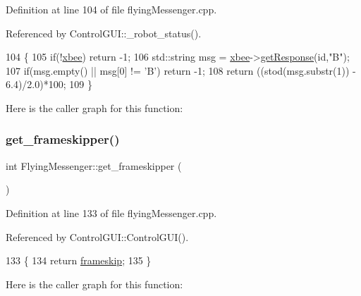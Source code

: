 Definition at line 104 of file flying\+Messenger.\+cpp.



Referenced by Control\+G\+U\+I\+::\+\_\+robot\+\_\+status().


\begin{DoxyCode}
104                                            \{
105     \textcolor{keywordflow}{if}(!\hyperlink{class_flying_messenger_a419820a45ea2bc496c10bf36b7b49033}{xbee}) \textcolor{keywordflow}{return} -1;
106     std::string msg = \hyperlink{class_flying_messenger_a419820a45ea2bc496c10bf36b7b49033}{xbee}->\hyperlink{class_serial_com_a7680deb087f1746d4d8c38d6fc2d25fb}{getResponse}(\textcolor{keywordtype}{id},\textcolor{stringliteral}{"B"});
107     \textcolor{keywordflow}{if}(msg.empty() || msg[0] != \textcolor{charliteral}{'B'}) \textcolor{keywordflow}{return} -1;
108     \textcolor{keywordflow}{return} ((stod(msg.substr(1)) - 6.4)/2.0)*100;
109 \}
\end{DoxyCode}
Here is the caller graph for this function\+:
\mbox{\label{class_flying_messenger_abf612e12b2a70f8069defbaa265d30d7}} 
\subsubsection{\texorpdfstring{get\+\_\+frameskipper()}{get\_frameskipper()}}
{\footnotesize\ttfamily int Flying\+Messenger\+::get\+\_\+frameskipper (\begin{DoxyParamCaption}{ }\end{DoxyParamCaption})}



Definition at line 133 of file flying\+Messenger.\+cpp.



Referenced by Control\+G\+U\+I\+::\+Control\+G\+U\+I().


\begin{DoxyCode}
133                                       \{
134     \textcolor{keywordflow}{return} \hyperlink{class_flying_messenger_af2bf887194a8483cbadb5e27d2ec6b58}{frameskip};
135 \}
\end{DoxyCode}
Here is the caller graph for this function\+:
\mbox{\label{class_flying_messenger_ac21061f46ad40fc1e352b6169ad4b62a}} 
